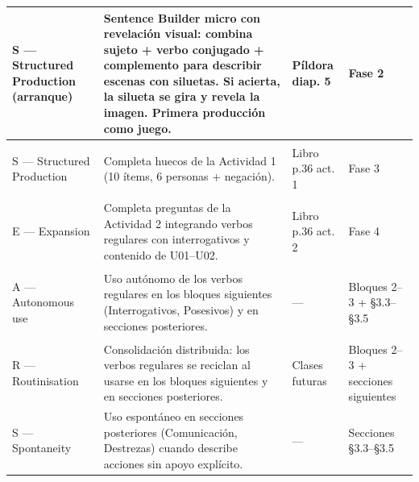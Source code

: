 \documentclass[a4paper,10pt]{article}
\begin{document}
{\begin{longtable}{|>{\bfseries\raggedright\arraybackslash}p{2.4cm}|p{4.5cm}|p{3.2cm}|p{2.8cm}|}
S — Structured Production (arranque) & Sentence Builder micro con revelación visual: combina sujeto + verbo conjugado + complemento para describir escenas con siluetas. Si acierta, la silueta se gira y revela la imagen. Primera producción como juego. & Píldora diap. 5 & Fase 2 \\
\hline

S — Structured Production & Completa huecos de la Actividad 1 (10 ítems, 6 personas + negación). & Libro p.36 act. 1 & Fase 3 \\
\hline

E — Expansion & Completa preguntas de la Actividad 2 integrando verbos regulares con interrogativos y contenido de U01--U02. & Libro p.36 act. 2 & Fase 4 \\
\hline

A — Autonomous use & Uso autónomo de los verbos regulares en los bloques siguientes (Interrogativos, Posesivos) y en secciones posteriores. & — & Bloques 2--3 + §3.3--§3.5 \\
\hline

R — Routinisation & Consolidación distribuida: los verbos regulares se reciclan al usarse en los bloques siguientes y en secciones posteriores. & Clases futuras & Bloques 2--3 + secciones siguientes \\
\hline

S — Spontaneity & Uso espontáneo en secciones posteriores (Comunicación, Destrezas) cuando describe acciones sin apoyo explícito. & — & Secciones §3.3--§3.5 \\
\hline
\end{longtable}
}

\vspace{0.3cm}
\end{document}
